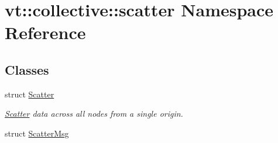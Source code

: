 \hypertarget{namespacevt_1_1collective_1_1scatter}{}\section{vt\+:\+:collective\+:\+:scatter Namespace Reference}
\label{namespacevt_1_1collective_1_1scatter}
\subsection*{Classes}
\begin{DoxyCompactItemize}
\item 
struct \hyperlink{structvt_1_1collective_1_1scatter_1_1_scatter}{Scatter}
\begin{DoxyCompactList}\small\item\em \hyperlink{structvt_1_1collective_1_1scatter_1_1_scatter}{Scatter} data across all nodes from a single origin. \end{DoxyCompactList}\item 
struct \hyperlink{structvt_1_1collective_1_1scatter_1_1_scatter_msg}{Scatter\+Msg}
\end{DoxyCompactItemize}
